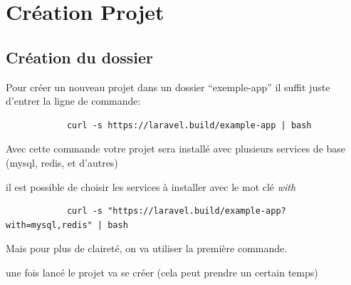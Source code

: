 \documentclass[internal]{nhitec_design}
\begin{document}
\newpage

\section[Création Projet Laravel]{Création Projet \laravel{}}

    \subsection{Création du dossier}
        Pour créer un nouveau projet \laravel{} dans un dossier ``exemple-app'' il suffit juste d'entrer la ligne de commande:

        \begin{lstlisting}
            curl -s https://laravel.build/example-app | bash
        \end{lstlisting}

        Avec cette commande votre projet sera installé avec plusieurs services de base (mysql, redis, et d'autres)

        il est possible de choisir les services à installer avec le mot clé \textit{with}

        \begin{lstlisting}
            curl -s "https://laravel.build/example-app?with=mysql,redis" | bash
        \end{lstlisting}
        Mais pour plus de claireté, on va utiliser la première commande.

        une fois lancé le projet va se créer (cela peut prendre un certain temps)
\end{document}
